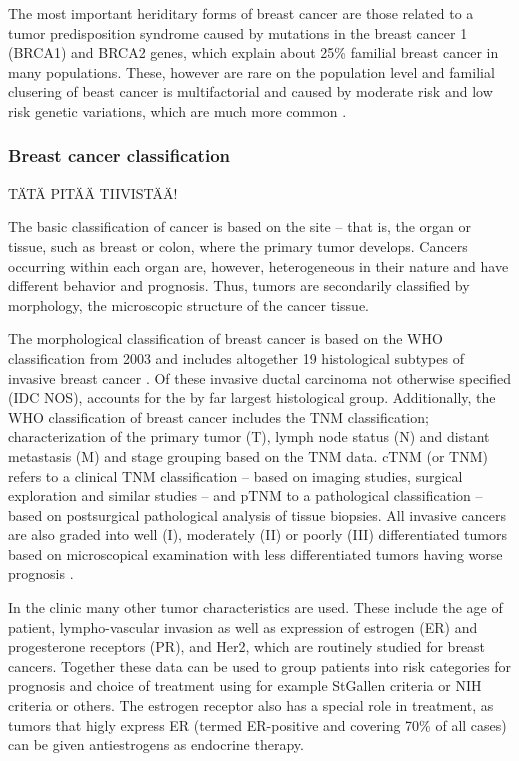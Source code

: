 The most important heriditary forms of breast cancer are those related to a
tumor predisposition syndrome caused by mutations in the breast cancer 1
(BRCA1) and BRCA2 genes, which explain about 25\% familial breast cancer in
many populations. These, however are rare on the population level and familial
clusering of beast cancer is multifactorial and caused by moderate risk and
low risk genetic variations, which are much more common \citep{Melchor2013}.


\subsubsection{Breast cancer classification}\label{breast-cancer-classification}

TÄTÄ PITÄÄ TIIVISTÄÄ!

The basic classification of cancer is based on the site -- that is, the organ
or tissue, such as breast or colon, where the primary tumor develops. Cancers
occurring within each organ are, however, heterogeneous in their nature and
have different behavior and prognosis. Thus, tumors are secondarily classified
by morphology, the microscopic structure of the cancer tissue.

The morphological classification of breast cancer is based on the WHO
classification from 2003 and includes altogether 19 histological subtypes of
invasive breast cancer \citep{Tavassoli2003,Weigelt2009}. Of these invasive
ductal carcinoma not otherwise specified (IDC NOS), accounts for the by far
largest histological group. Additionally, the WHO classification of
breast cancer includes the
TNM classification; characterization of the primary tumor (T), lymph node
status (N) and distant metastasis (M) and stage grouping based on the TNM
data. cTNM (or TNM) refers to a clinical TNM classification -- based on imaging studies,
surgical exploration and similar studies -- and pTNM to a pathological
classification -- based on postsurgical pathological analysis of tissue
biopsies. All invasive cancers are also graded into well (I), moderately (II)
or poorly (III) differentiated tumors based on microscopical examination
with less differentiated tumors having worse prognosis \citep{Tavassoli2003}.

In the clinic many other tumor characteristics are used. These
include the age of patient, lympho-vascular invasion as well as expression of
estrogen (ER) and progesterone receptors (PR), and Her2, which are routinely
studied for breast cancers. Together these data can be used to group patients
into risk categories for prognosis and choice of treatment using for example
StGallen criteria \citep{Goldhirsch2007} or NIH criteria \citep{Eifel2001} or others.
The estrogen receptor also has a special role in treatment, as tumors that higly express ER
(termed ER-positive and covering 70\% of all cases) can be given antiestrogens
as endocrine therapy.

